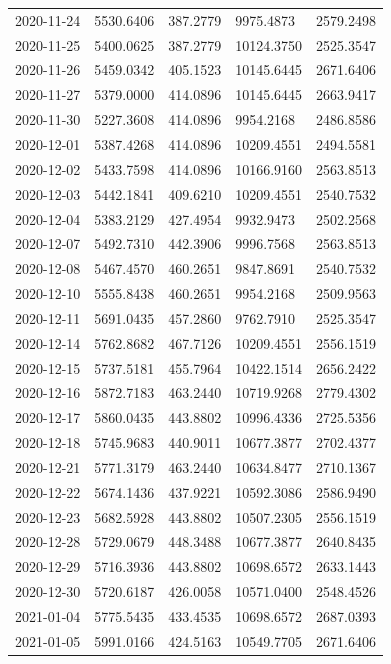 \begin{footnotesize}
\begin{longtable}{lllll}
2020-11-24 & 5530.6406 & 387.2779 & 9975.4873 & 2579.2498 \\
2020-11-25 & 5400.0625 & 387.2779 & 10124.3750 & 2525.3547 \\
2020-11-26 & 5459.0342 & 405.1523 & 10145.6445 & 2671.6406 \\
2020-11-27 & 5379.0000 & 414.0896 & 10145.6445 & 2663.9417 \\
2020-11-30 & 5227.3608 & 414.0896 & 9954.2168 & 2486.8586 \\
2020-12-01 & 5387.4268 & 414.0896 & 10209.4551 & 2494.5581 \\
2020-12-02 & 5433.7598 & 414.0896 & 10166.9160 & 2563.8513 \\
2020-12-03 & 5442.1841 & 409.6210 & 10209.4551 & 2540.7532 \\
2020-12-04 & 5383.2129 & 427.4954 & 9932.9473 & 2502.2568 \\
2020-12-07 & 5492.7310 & 442.3906 & 9996.7568 & 2563.8513 \\
2020-12-08 & 5467.4570 & 460.2651 & 9847.8691 & 2540.7532 \\
2020-12-10 & 5555.8438 & 460.2651 & 9954.2168 & 2509.9563 \\
2020-12-11 & 5691.0435 & 457.2860 & 9762.7910 & 2525.3547 \\
2020-12-14 & 5762.8682 & 467.7126 & 10209.4551 & 2556.1519 \\
2020-12-15 & 5737.5181 & 455.7964 & 10422.1514 & 2656.2422 \\
2020-12-16 & 5872.7183 & 463.2440 & 10719.9268 & 2779.4302 \\
2020-12-17 & 5860.0435 & 443.8802 & 10996.4336 & 2725.5356 \\
2020-12-18 & 5745.9683 & 440.9011 & 10677.3877 & 2702.4377 \\
2020-12-21 & 5771.3179 & 463.2440 & 10634.8477 & 2710.1367 \\
2020-12-22 & 5674.1436 & 437.9221 & 10592.3086 & 2586.9490 \\
2020-12-23 & 5682.5928 & 443.8802 & 10507.2305 & 2556.1519 \\
2020-12-28 & 5729.0679 & 448.3488 & 10677.3877 & 2640.8435 \\
2020-12-29 & 5716.3936 & 443.8802 & 10698.6572 & 2633.1443 \\
2020-12-30 & 5720.6187 & 426.0058 & 10571.0400 & 2548.4526 \\
2021-01-04 & 5775.5435 & 433.4535 & 10698.6572 & 2687.0393 \\
2021-01-05 & 5991.0166 & 424.5163 & 10549.7705 & 2671.6406 \\

\end{longtable}
\end{footnotesize}
